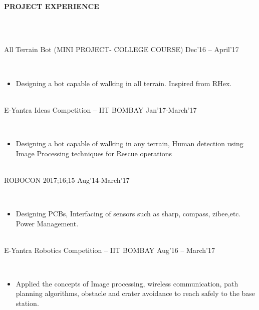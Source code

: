 \documentclass[a4paper,12pt]{report}
\begin{document}
\begin{adjustwidth}{-0.59in}{0.0in}
\\
\vspace{1cm}
\textbf{PROJECT EXPERIENCE}
\end{adjustwidth}
 \\
\vspace{12pt}
\begin{adjustwidth}{0.0in}{-0.52in}
\\
All Terrain Bot (MINI PROJECT- COLLEGE COURSE)  \hspace{10pt}  \hspace{10pt}  \hspace{10pt}        \hspace{10pt}                                   Dec’16 – April’17
\end{adjustwidth}
 \\
\begin{itemize}
\item Designing a bot capable of walking in all terrain. Inspired from RHex. \\
\end{itemize}
\begin{adjustwidth}{0.0in}{-0.52in}
\\
E-Yantra Ideas Competition – IIT BOMBAY                                                                                                         Jan’17-March’17
\end{adjustwidth}
 \\
\begin{itemize}
\item Designing a bot capable of walking in any terrain, Human detection using Image Processing techniques  for Rescue operations \\
\end{itemize}
\begin{adjustwidth}{0.0in}{-0.52in}
\\
ROBOCON 2017;16;15                                                                                                                                             Aug’14-March’17
\end{adjustwidth}
 \\
\begin{itemize}
\item Designing PCBs, Interfacing of sensors such as sharp, compass, zibee,etc. Power Management. \\
\end{itemize}
\begin{adjustwidth}{0.0in}{-0.52in}
\\
E-Yantra Robotics Competition – IIT BOMBAY \hspace{10pt}  \hspace{10pt}  \hspace{10pt}  \hspace{10pt}  \hspace{10pt}  \hspace{10pt}   \hspace{10pt}    Aug’16 – March’17
\end{adjustwidth}
 \\
\begin{itemize}
\item Applied the concepts of Image processing, wireless communication, path planning algorithms, obstacle and crater avoidance to reach safely to the base station. \\
\vspace{12pt}
\vspace{12pt}
\end{itemize}
\end{document}
